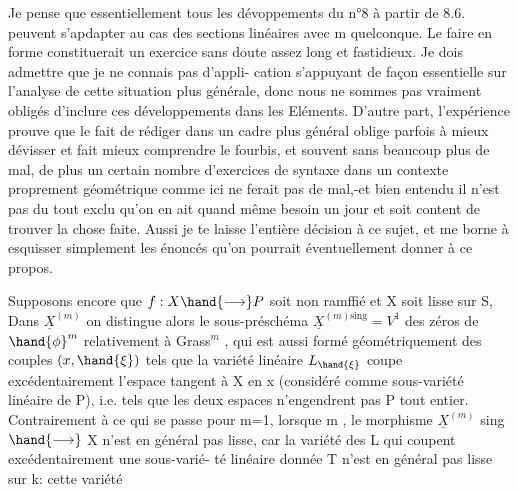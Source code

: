 

Je pense que essentiellement tous les dévoppements du n°8 à
partir de 8.6. peuvent s'apdapter  au cas des sections linéaires avec
m quelconque. Le faire en forme constituerait un exercice sans doute
assez long et fastidieux. Je dois admettre que je ne connais pas d'appli-%
cation s'appuyant de façon essentielle sur l'analyse de cette situation
plus générale, donc nous ne sommes pas vraiment obligés d'inclure ces
développements dans les Eléments. D'autre part, l'expérience prouve que
le fait de rédiger dans un cadre plus général oblige parfois à mieux
dévisser et fait mieux comprendre le fourbis, et souvent sans beaucoup
plus de mal, de plus un certain nombre d'exercices de syntaxe dans un
contexte proprement géométrique comme ici ne ferait pas de mal,-et
bien entendu il n'est pas du tout exclu qu'on en ait quand même besoin
un jour et soit content de trouver la chose faite. Aussi je te laisse
l'entière décision à ce sujet, et me borne à esquisser simplement les
énoncés qu'on pourrait éventuellement donner à ce propos.

Supposons encore que $f:X \hand{\longrightarrow} P$ soit non ramffié et X soit lisse sur
S, %
Dans $\underline{X}^{(m)}$  on distingue alors le sous-préschéma $\underline{X}^{(m)\mathrm{sing}} = V^1$
des zéros  de $\hand{\phi}^m$ relativement à Grass$^m$ , qui est aussi formé
géométriquement des couples $(x,\hand{\xi})$ tels que la variété linéaire $L_{\hand{\xi}}$
coupe excédentairement l'espace tangent à X en x (considéré comme
sous-variété linéaire de P), i.e. tels que les deux espaces n'engendrent
pas P tout entier. Contrairement à ce qui se passe pour m=1, lorsque
m , le morphisme $\underline{X}^{(m)}$ sing $\hand{\longrightarrow}$ X n'est en général pas
lisse, car la variété des L qui %
coupent excédentairement une sous-varié-%
té linéaire donnée T n'est en général pas lisse sur k: cette variété

